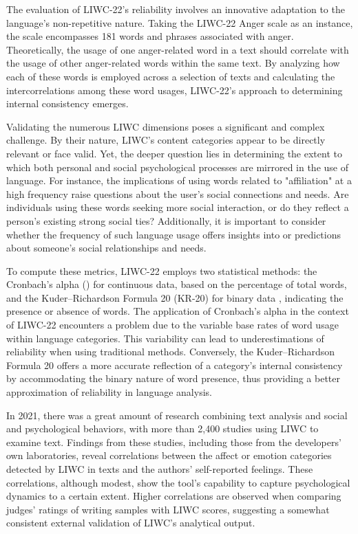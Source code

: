 The evaluation of LIWC-22's reliability involves an innovative adaptation to the language's non-repetitive nature. Taking the LIWC-22 Anger scale as an instance, the scale encompasses 181 words and phrases associated with anger. Theoretically, the usage of one anger-related word in a text should correlate with the usage of other anger-related words within the same text. By analyzing how each of these words is employed across a selection of texts and calculating the intercorrelations among these word usages, LIWC-22's approach to determining internal consistency emerges\cite{boyd2022development}.

Validating the numerous LIWC dimensions poses a significant and complex challenge. By their nature, LIWC's content categories appear to be directly relevant or face valid. Yet, the deeper question lies in determining the extent to which both personal and social psychological processes are mirrored in the use of language. For instance, the implications of using words related to "affiliation" at a high frequency raise questions about the user's social connections and needs. Are individuals using these words seeking more social interaction, or do they reflect a person's existing strong social ties? Additionally, it is important to consider whether the frequency of such language usage offers insights into or predictions about someone's social relationships and needs.

To compute these metrics, LIWC-22 employs two statistical methods: the Cronbach’s alpha (\textalpha) for continuous data, based on the percentage of total words, and the Kuder–Richardson Formula 20 (KR-20) for binary data \cite{kuder1937theory}, indicating the presence or absence of words. The application of Cronbach’s alpha in the context of LIWC-22 encounters a problem due to the variable base rates of word usage within language categories. This variability can lead to underestimations of reliability when using traditional methods. Conversely, the Kuder–Richardson Formula 20 offers a more accurate reflection of a category's internal consistency by accommodating the binary nature of word presence, thus providing a better approximation of reliability in language analysis.

In 2021, there was a great amount of research combining text analysis and social and psychological behaviors, with more than 2,400 studies using LIWC to examine text. Findings from these studies, including those from the developers' own laboratories, reveal correlations between the affect or emotion categories detected by LIWC in texts and the authors' self-reported feelings. These correlations, although modest, show the tool's capability to capture psychological dynamics to a certain extent. Higher correlations are observed when comparing judges' ratings of writing samples with LIWC scores, suggesting a somewhat consistent external validation of LIWC's analytical output\cite{boyd2022development}.


